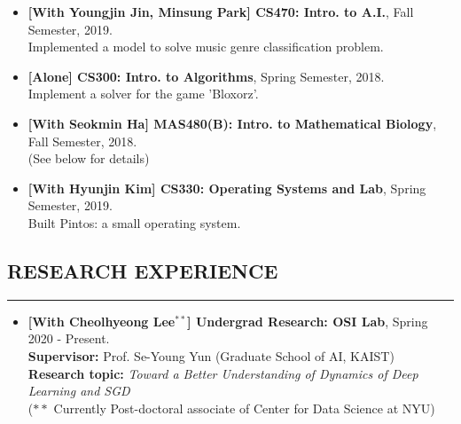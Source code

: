 \documentclass[10pt,a4]{article}
\begin{document}
\begin{small}
\begin{itemize}
\item {\bf [With Youngjin Jin, Minsung Park] CS470: Intro. to A.I.}, Fall Semester, 2019. \\
 Implemented a model to solve music genre classification problem.

\item {\bf [Alone] CS300: Intro. to Algorithms}, Spring Semester, 2018. \\
 Implement a solver for the game 'Bloxorz'.

\item {\bf [With Seokmin Ha] MAS480(B): Intro. to Mathematical Biology}, Fall Semester, 2018. \\
 (See below for details)

\item {\bf [With Hyunjin Kim] CS330: Operating Systems and Lab}, Spring Semester, 2019. \\
 Built Pintos: a small operating system.
 
\end{itemize}



\subsection*{RESEARCH EXPERIENCE}
\hrule
\vspace{0.2cm}
\begin{itemize}
  
 \item {\bf [With Cheolhyeong Lee$^{**}$] Undergrad Research: OSI Lab}, Spring 2020 - Present. \\
 {\bf Supervisor:} Prof. Se-Young Yun (Graduate School of AI, KAIST) \\
 {\bf Research topic:} {\it Toward a Better Understanding of Dynamics of Deep Learning and SGD } \\
 ($**$ Currently Post-doctoral associate of Center for Data Science at NYU)\\



\end{itemize}
\end{small}
\end{document}

